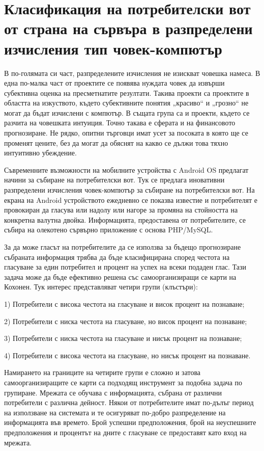 \section{Класификация на потребителски вот от страна на сървъра в разпределени изчисления тип човек-компютър}

В по-голямата си част, разпределените изчисления не изискват човешка намеса. В една по-малка част от проектите се появява нуждата човек да извърши субективна оценка на пресметнатите резултати. Такива проекти са проектите в областта на изкуството, където субективните понятия „красиво“ и „грозно“ не могат да бъдат изчислени с компютър. В същата група са и проекти, където се разчита на човешката интуиция. Точно такава е сферата и на финансовото прогнозиране. Не рядко, опитни търговци имат усет за посоката в която ще се променят цените, без да могат да обяснят на какво се дължи това тяхно интуитивно убеждение. 

Съвременните възможности на мобилните устройства с Android OS предлагат начини за събиране на потребителски вот. Тук се предлага иновативни разпределени изчисления човек-компютър за събиране на потребителски вот. На екрана на Android устройството ежедневно се показва известие и потребителят е провокиран да гласува или
надолу или нагоре за промяна на стойността на конкретна валутна двойка. Информацията, предоставена от потребителите, се събира на олекотено сървърно приложение с основа PHP/MySQL.

За да може гласът на потребителите да се използва за бъдещо прогнозиране събраната информация трябва да бъде класифицирана според честота на гласуване за един потребител и процент на успех на всеки подаден глас. Тази задача може да бъде ефективно решена със самоорганизиращи се карти на Кохонен. Тук интерес представляват четири групи (клъстъри):

1) Потребители с висока честота на гласуване и висок процент на познаване;

2) Потребители с ниска честота на гласуване, но висок процент на познаване;

3) Потребители с ниска честота на гласуване и нисък процент на познаване;

4) Потребители с висока честота на гласуване, но нисък процент на познаване.

Намирането на границите на четирите групи е сложно и затова самоорганизиращите се карти са подходящ инструмент за подобна задача по групиране. Мрежата се обучава с информацията, събрана от различни потребители с различна дейност. Някои от потребителите имат по-дълъг период на използване на системата и те осигуряват по-добро разпределение на информацията във времето. Брой успешни предположения, брой на неуспешните предположения и процентът на дните с гласуване се предоставят като вход на мрежата.

